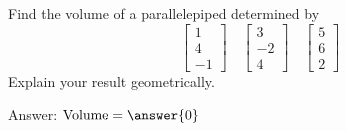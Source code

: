 \documentclass{ximera}
\begin{document}
    \begin{problem}\label{prob:volparallelepiped0}
    Find the volume of a parallelepiped determined by
    $$\begin{bmatrix}1\\4\\-1\end{bmatrix}\quad\begin{bmatrix}3\\-2\\4\end{bmatrix}\quad\begin{bmatrix}5\\6\\2\end{bmatrix}$$
    Explain your result geometrically.
     
    Answer: $\mbox{Volume}=\answer{0}$
    \end{problem}
\end{document}
